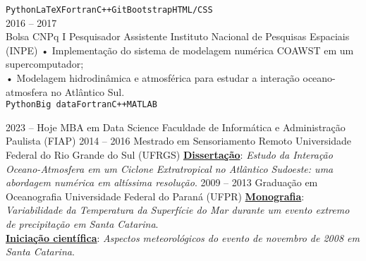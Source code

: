 \documentclass[9pt]{developercv} %
\begin{document}
\begin{entrylist}
{		\texttt{Python}\slashsep\texttt{LaTeX}\slashsep\texttt{Fortran}\slashsep\texttt{C++}\slashsep\texttt{Git}\slashsep\texttt{Bootstrap}\slashsep\texttt{HTML/CSS}}
		\\\entry
		{2016 -- 2017\\\footnotesize{Bolsa CNPq I}}
		{Pesquisador Assistente}
		{Instituto Nacional de Pesquisas Espaciais (INPE)}
		{•  Implementação do sistema de modelagem numérica COAWST em um supercomputador; \\
		 • Modelagem hidrodinâmica e atmosférica para estudar a interação oceano-atmosfera no Atlântico Sul. 
		 \\ \texttt{Python}\slashsep\texttt{Big data}\slashsep\texttt{Fortran}\slashsep\texttt{C++}\slashsep\texttt{MATLAB}}
\end{entrylist}

\vspace{-0.5cm}

\begin{entrylist}
	\entry
		{2023 -- Hoje}
		{MBA em Data Science}
		{Faculdade de Informática e Administração Paulista (FIAP)}
		{}
		\entry
		{2014 -- 2016}
		{Mestrado em Sensoriamento Remoto}
		{Universidade Federal do Rio Grande do Sul (UFRGS)}
		{\href{https://lume.ufrgs.br/handle/10183/171223}{\textcolor{bleu_cite}{\textbf{Dissertação}}}: \textit{Estudo da Interação Oceano-Atmosfera em um Ciclone Extratropical no Atlântico Sudoeste: uma abordagem numérica em altíssima resolução}.}
	\entry
		{2009 -- 2013}
		{Graduação em Oceanografia}
		{Universidade Federal do Paraná (UFPR)}
		{\href{http://doi.org/10.13140/RG.2.2.15184.35847}{\textcolor{bleu_cite}{\textbf{Monografia}}}: \textit{Variabilidade da Temperatura da Superfície do Mar durante um evento extremo de precipitação em Santa Catarina}. 
		\\ \href{http://doi.org/10.13140/RG.2.2.25250.68800}{\textcolor{bleu_cite}{\textbf{Iniciação científica}}}: \textit{Aspectos meteorológicos do evento de novembro de 2008 em Santa Catarina}.
		}
\end{entrylist}

\vspace{-0.4cm}
\end{document}
